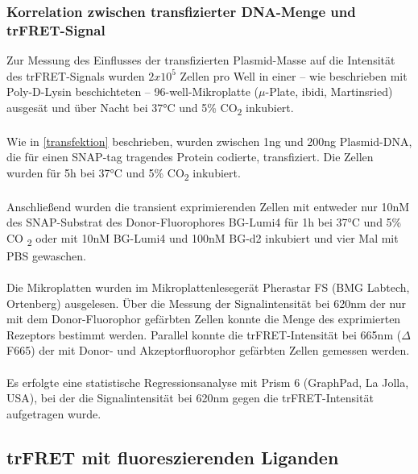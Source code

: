 \subsubsection{Korrelation zwischen transfizierter DNA-Menge und trFRET-Signal}
Zur Messung des Einflusses der transfizierten Plasmid-Masse auf die Intensität des trFRET-Signals wurden $2x10^5$ Zellen pro Well in einer -- wie beschrieben mit Poly-D-Lysin beschichteten -- 96-well-Mikroplatte ($\mu$-Plate, ibidi, Martinsried) ausgesät und über Nacht bei 37\si{\celsius} und 5\% CO\textsubscript{2} inkubiert.
\\ \\
Wie in \ref{transfektion} beschrieben, wurden zwischen 1\si{\nano\gram} und 200\si{\nano\gram} Plasmid-DNA, die für einen SNAP-tag tragendes Protein codierte, transfiziert. Die Zellen wurden für 5\si{\hour} bei 37\si{\celsius} und 5\% CO\textsubscript{2} inkubiert.
\\ \\
Anschließend wurden die transient exprimierenden Zellen mit entweder nur 10\si{\nano M} des SNAP-Substrat des Donor-Fluorophores BG-Lumi4 für 1\si{\hour} bei 37\si{\celsius} und 5\% CO \textsubscript{2} oder mit 10\si{\nano M} BG-Lumi4 und 100\si{\nano M} BG-d2 inkubiert und vier Mal mit PBS gewaschen.
\\ \\
Die Mikroplatten wurden im Mikroplattenlesegerät Pherastar FS (BMG Labtech, Ortenberg) ausgelesen. Über die Messung der Signalintensität bei 620\si{\nano\meter} der nur mit dem Donor-Fluorophor gefärbten Zellen konnte die Menge des exprimierten Rezeptors bestimmt werden. Parallel konnte die trFRET-Intensität bei 665\si{\nano\meter} ($\Delta$F665) der mit Donor- und Akzeptorfluorophor gefärbten Zellen gemessen werden.
\\ \\
Es erfolgte eine statistische Regressionsanalyse mit Prism 6 (GraphPad, La Jolla, USA), bei der die Signalintensität bei 620\si{\nano\meter} gegen die trFRET-Intensität aufgetragen wurde.

\subsection{trFRET mit fluoreszierenden Liganden}
